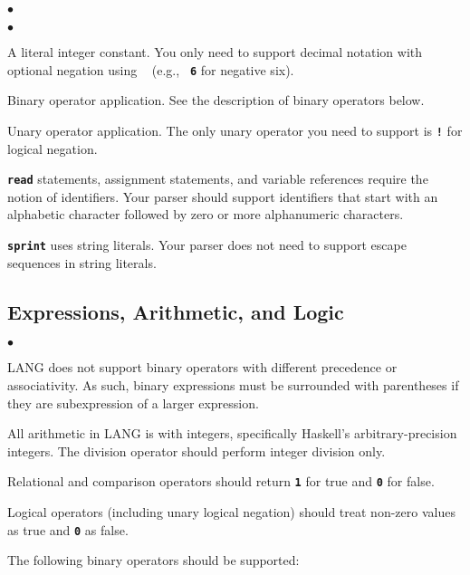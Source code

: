 \documentclass[12pt]{article}
\newcommand\code[1]{\texttt{\textbf{#1}}}
\newenvironment{notelist}{\begin{list}
   {$\bullet$}
   {\setlength{\itemsep}{0in}}}
   {\end{list}}
\begin{document}
\begin{notelist}
\begin{notelist}
            \item A literal integer constant. You only need to support decimal notation with optional negation using \code{~} (e.g., \code{~6} for negative six).
            \item Binary operator application. See the description of binary operators below.
            \item Unary operator application. The only unary operator you need to support is \code{!} for logical negation.
        \end{notelist}
    \item \code{read} statements, assignment statements, and variable references require the notion of identifiers. Your
          parser should support identifiers that start with an alphabetic character followed by zero or more alphanumeric
          characters.
    \item \code{sprint} uses string literals. Your parser does not need to support escape sequences in string literals.
\end{notelist}

\subsection{Expressions, Arithmetic, and Logic}

\begin{notelist}
    \item LANG does not support binary operators with different precedence or associativity. As such, binary expressions must
          be surrounded with parentheses if they are subexpression of a larger expression.
    \item All arithmetic in LANG is with integers, specifically Haskell's arbitrary-precision integers. The division operator
          should perform integer division only.
    \item Relational and comparison operators should return \code{1} for true and \code{0} for false.
    \item Logical operators (including unary logical negation) should treat non-zero values as true and \code{0} as false.
\end{notelist}

The following binary operators should be supported:
\end{document}
